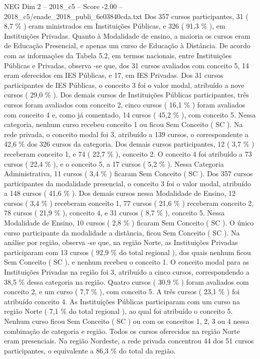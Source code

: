 \begin{textsample}{NEG Dim 2 – 2018\_c5 – Score -2.00 – 2018\_c5/enade\_2018\_publi\_6e03840cda.txt}
Dos 357 cursos participantes, 31 ( 8,7 \% ) eram ministrados em Instituições Públicas, e 326 ( 91,3 \% ), em Instituições Privadas.
Quanto à Modalidade de ensino, a maioria os cursos eram de Educação Presencial, e apenas um curso de Educação à Distância.
De acordo com as informações da Tabela 5.2, em termos nacionais, entre Instituições Públicas e Privadas, observa -se que, dos 31 cursos avaliados com conceito 5, 14 eram oferecidos em IES Públicas, e 17, em IES Privadas.
Dos 31 cursos participantes de IES Públicas, o conceito 3 foi o valor modal, atribuído a nove cursos ( 29,0 \% ).
Dos demais cursos de Instituições Públicas participantes, três cursos foram avaliados com conceito 2, cinco cursos ( 16,1 \% ) foram avaliados com conceito 4 e, como já comentado, 14 cursos ( 45,2 \% ), com conceito 5.
Nessa categoria, nenhum curso recebeu conceito 1 ou ficou Sem Conceito ( SC ).
Na rede privada, o conceito modal foi 3, atribuído a 139 cursos, o correspondente a 42,6 \% dos 326 cursos da categoria.
Dos demais cursos participantes, 12 ( 3,7 \% ) receberam conceito 1, e 74 ( 22,7 \% ), conceito 2.
O conceito 4 foi atribuído a 73 cursos ( 22,4 \% ), e o conceito 5, a 17 cursos ( 5,2 \% ).
Nessa Categoria Administrativa, 11 cursos ( 3,4 \% ) ficaram Sem Conceito ( SC ).
Dos 357 cursos participantes da modalidade presencial, o conceito 3 foi o valor modal, atribuído a 148 cursos ( 41,6 \% ).
Dos demais cursos nessa Modalidade de Ensino, 12 cursos ( 3,4 \% ) receberam conceito 1, 77 cursos ( 21,6 \% ) receberam conceito 2, 78 cursos ( 21,9 \% ), conceito 4, e 31 cursos ( 8,7 \% ), conceito 5.
Nessa Modalidade de Ensino, 10 cursos ( 2,8 \% ) ficaram Sem Conceito ( SC ).
O único curso participante da modalidade a distância, ficou Sem Conceito ( SC ).
Na análise por região, observa -se que, na região Norte, as Instituições Privadas participaram com 13 cursos ( 92,9 \% do total regional ), dos quais nenhum ficou Sem Conceito ( SC ), e nenhum recebeu o conceito 1.
O conceito modal para as Instituições Privadas na região foi 3, atribuído a cinco cursos, correspondendo a 38,5 \% dessa categoria na região.
Quatro cursos ( 30,9 \% ) foram avaliados com conceito 2, e um curso ( 7,7 \% ), com conceito 5.
A três cursos ( 23,1 \% ) foi atribuído conceito 4.
As Instituições Públicas participaram com um curso na região Norte ( 7,1 \% do total regional ), ao qual foi atribuído o conceito 5.
Nenhum curso ficou Sem Conceito ( SC ) ou com os conceitos 1, 2, 3 ou 4 nessa combinação de categoria e região.
Todos os cursos oferecidos na região Norte eram presenciais.
Na região Nordeste, a rede privada concentrou 44 dos 51 cursos participantes, o equivalente a 86,3 \% do total da região.

\end{textsample}
